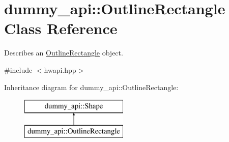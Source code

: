 \hypertarget{classdummy__api_1_1OutlineRectangle}{}\section{dummy\+\_\+api\+:\+:Outline\+Rectangle Class Reference}
\label{classdummy__api_1_1OutlineRectangle}


Describes an \mbox{\hyperlink{classdummy__api_1_1OutlineRectangle}{Outline\+Rectangle}} object.  




{\ttfamily \#include $<$hwapi.\+hpp$>$}

Inheritance diagram for dummy\+\_\+api\+:\+:Outline\+Rectangle\+:\begin{figure}[H]
\begin{center}
\leavevmode
\includegraphics[height=2.000000cm]{classdummy__api_1_1OutlineRectangle}
\end{center}
\end{figure}
